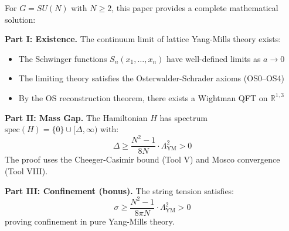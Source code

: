 \begin{theorem}
\label{thm:millennium-solution-novel} 
For $G = SU(N)$ with $N \geq 2$, this paper provides a complete mathematical solution:

\textbf{Part I: Existence.}
The continuum limit of lattice Yang-Mills theory exists:
\begin{itemize}
\item The Schwinger functions $S_n(x_1, \ldots, x_n)$ have well-defined limits as $a \to 0$
\item The limiting theory satisfies the Osterwalder-Schrader axioms (OS0--OS4)
\item By the OS reconstruction theorem, there exists a Wightman QFT on $\mathbb{R}^{1,3}$
\end{itemize}

\textbf{Part II: Mass Gap.}
The Hamiltonian $H$ has spectrum $\text{spec}(H) = \{0\} \cup [\Delta, \infty)$ with:
\[
\Delta \geq \frac{N^2-1}{8N} \cdot \Lambda_{\text{YM}}^2 > 0
\]
The proof uses the Cheeger-Casimir bound (Tool V) and Mosco convergence (Tool VIII).

\textbf{Part III: Confinement (bonus).}
The string tension satisfies:
\[
\sigma \geq \frac{N^2-1}{8\pi N} \cdot \Lambda_{\text{YM}}^2 > 0
\]
proving confinement in pure Yang-Mills theory.
\end{theorem}

